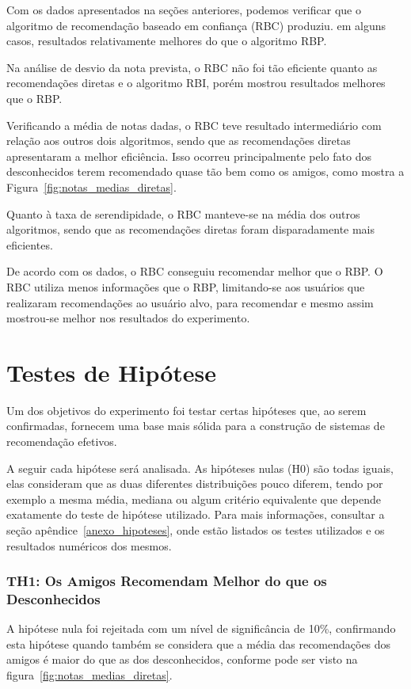  Com os dados apresentados na seções anteriores, podemos verificar que o algoritmo de recomendação baseado em confiança (RBC) produziu. em alguns casos, resultados relativamente melhores do que o algoritmo RBP.
 
 Na análise de desvio da nota prevista, o RBC não foi tão eficiente quanto as recomendações diretas e o algoritmo RBI, porém mostrou resultados melhores que o RBP. 
 
 Verificando a média de notas dadas, o RBC teve resultado intermediário com relação aos outros dois algoritmos, sendo que as recomendações diretas apresentaram a melhor eficiência. Isso ocorreu principalmente pelo fato dos desconhecidos terem recomendado quase tão bem como os amigos, como mostra a Figura~\ref{fig:notas_medias_diretas}.
 
 Quanto à taxa de serendipidade, o RBC manteve-se na média dos outros algoritmos, sendo que as recomendações diretas foram disparadamente mais eficientes.
 
 De acordo com os dados, o RBC conseguiu recomendar melhor que o RBP. O RBC utiliza menos informações que o RBP, limitando-se aos usuários que realizaram recomendações ao usuário alvo, para recomendar e mesmo assim mostrou-se melhor nos resultados do experimento.


\section{Testes de Hipótese}

Um dos objetivos do experimento foi testar certas hipóteses que, ao serem confirmadas, fornecem uma base mais sólida para a construção de sistemas de recomendação efetivos.

A seguir cada hipótese será analisada. As hipóteses nulas (H0) são todas iguais, elas consideram que as duas diferentes distribuições pouco diferem, tendo por exemplo a mesma média, mediana ou algum critério equivalente que depende exatamente do teste de hipótese utilizado. Para mais informações, consultar a seção apêndice~\ref{anexo_hipoteses}, onde estão listados os testes utilizados e os resultados numéricos dos mesmos.

\subsubsection{TH1: Os Amigos Recomendam Melhor do que os Desconhecidos}
A hipótese nula foi rejeitada com um nível de significância de 10\%, confirmando esta hipótese quando também se considera que a média das recomendações dos amigos é maior do que as dos desconhecidos, conforme pode ser visto na figura~\ref{fig:notas_medias_diretas}.


